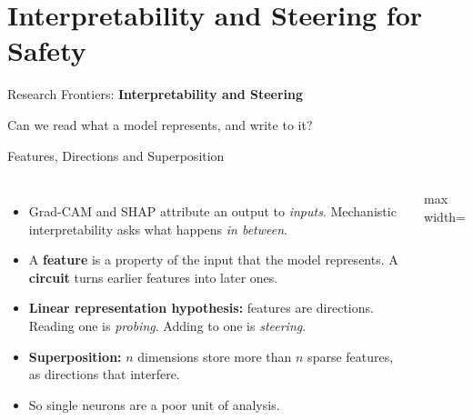 \section{Interpretability and Steering for Safety}

\begin{frame}{}
    \LARGE Research Frontiers: \textbf{Interpretability and Steering}

    \vspace{1em}
    \normalsize Can we read what a model represents, and write to it?
\end{frame}

\begin{frame}{Features, Directions and Superposition}
    \begin{columns}[T,onlytextwidth]
        \begin{itemize}\itemsep0.4em
            \item Grad-CAM and SHAP attribute an output to \emph{inputs}. Mechanistic interpretability asks what happens \emph{in between}.
            \item A \textbf{feature} is a property of the input that the model represents. A \textbf{circuit} turns earlier features into later ones.
            \item \textbf{Linear representation hypothesis:} features are directions. Reading one is \emph{probing}. Adding to one is \emph{steering}.
            \item \textbf{Superposition:} $n$ dimensions store more than $n$ sparse features, as directions that interfere.
            \item So single neurons are a poor unit of analysis.
        \end{itemize}
        \centering
        \begin{adjustbox}{max width=\linewidth}
\end{adjustbox}
\end{columns}
\end{frame}
